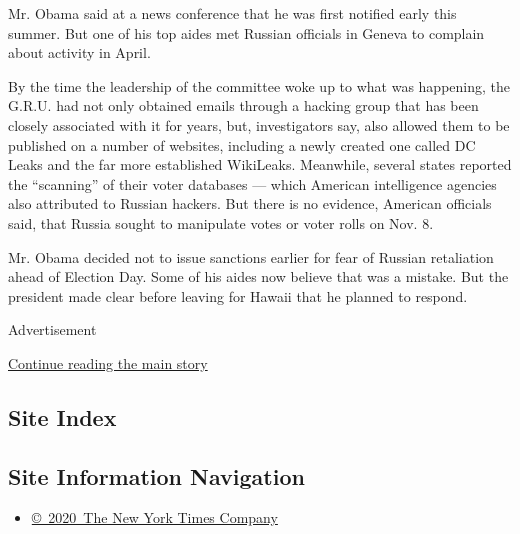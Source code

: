 Mr. Obama said at a news conference that he was first notified early
this summer. But one of his top aides met Russian officials in Geneva to
complain about activity in April.

By the time the leadership of the committee woke up to what was
happening, the G.R.U. had not only obtained emails through a hacking
group that has been closely associated with it for years, but,
investigators say, also allowed them to be published on a number of
websites, including a newly created one called DC Leaks and the far more
established WikiLeaks. Meanwhile, several states reported the
``scanning'' of their voter databases --- which American intelligence
agencies also attributed to Russian hackers. But there is no evidence,
American officials said, that Russia sought to manipulate votes or voter
rolls on Nov. 8.

Mr. Obama decided not to issue sanctions earlier for fear of Russian
retaliation ahead of Election Day. Some of his aides now believe that
was a mistake. But the president made clear before leaving for Hawaii
that he planned to respond.

Advertisement

\protect\hyperlink{after-bottom}{Continue reading the main story}

\hypertarget{site-index}{%
\subsection{Site Index}\label{site-index}}

\hypertarget{site-information-navigation}{%
\subsection{Site Information
Navigation}\label{site-information-navigation}}

\begin{itemize}
\tightlist
\item
  \href{https://help.nytimes.com/hc/en-us/articles/115014792127-Copyright-notice}{©~2020~The
  New York Times Company}
\end{itemize}

